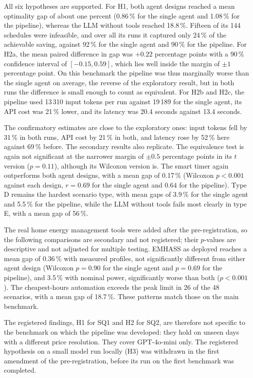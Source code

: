All six hypotheses are supported. For H1, both agent designs reached a
mean optimality gap of about one percent (0.86\,\% for the single agent
and 1.08\,\% for the pipeline), whereas the LLM without tools reached
18.8\,\%. Fifteen of its 144 schedules were infeasible, and over all its
runs it captured only 24\,\% of the achievable saving, against 92\,\% for
the single agent and 90\,\% for the pipeline. For H2a,
the mean paired difference in gap was $+0.22$ percentage points with a
90\,\% confidence interval of $[-0.15, 0.59]$, which lies well inside
the margin of $\pm 1$ percentage point. On this benchmark the pipeline
was thus marginally worse than the single agent on average, the reverse
of the exploratory result, but in both runs the difference is small
enough to count as equivalent. For H2b and H2c, the pipeline used
13\,310 input tokens per run against 19\,189 for the single agent, its API
cost was 21\,\% lower, and its latency was 20.4 seconds against 13.4
seconds.

The confirmatory estimates are close to the exploratory ones:
input tokens fell by 31\,\% in both runs, API cost by 21\,\% in both, and
latency rose by 52\,\% here against 69\,\% before. The secondary results
also replicate. The equivalence test is again not significant at the
narrower margin of $\pm 0.5$ percentage points in its $t$ version
($p = 0.11$), although its Wilcoxon version is. The smart timer again
outperforms both agent designs, with a mean gap of 0.17\,\% (Wilcoxon
$p < 0.001$ against each design, $r = 0.69$ for the single agent and
$0.64$ for the pipeline). Type D remains the hardest scenario type, with
mean gaps of 3.9\,\% for the single agent and 5.5\,\% for the pipeline,
while the LLM without tools fails most clearly in type E, with a mean gap
of 56\,\%.

The real home energy management tools were added after the
pre-registration, so the following comparisons are secondary and not
registered; their $p$-values are descriptive and not adjusted for
multiple testing. EMHASS as deployed reaches a mean gap of 0.36\,\% with
measured profiles, not significantly different from either agent design
(Wilcoxon $p = 0.90$ for the single agent and $p = 0.69$ for the
pipeline), and 3.5\,\% with nominal power, significantly worse than both
($p < 0.001$). The cheapest-hours automation exceeds the peak limit in 26
of the 48 scenarios, with a mean gap of 18.7\,\%. These patterns match
those on the main benchmark.

The registered findings, H1 for SQ1 and H2 for SQ2, are therefore not
specific to the benchmark on which the pipeline was developed: they hold
on unseen days with a different price resolution. They cover GPT-4o-mini
only. The registered hypothesis on a small model run locally (H3) was
withdrawn in the first amendment of the pre-registration, before its run
on the first benchmark was completed.


